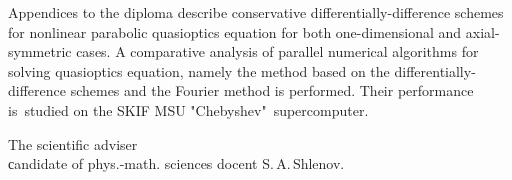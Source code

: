 \documentclass[12pt,a4paper]{article}
\begin{document}
Appendices to the diploma describe conservative differentially-difference schemes for nonlinear parabolic quasioptics equation
for both one-dimensional and axial-symmetric cases. A comparative analysis of parallel numerical algorithms for solving quasioptics equation,
namely the method based on the differentially-difference schemes and the Fourier method is performed.
Their performance is~studied on the SKIF MSU "Chebyshev"\ supercomputer.

\vspace{4ex}

The scientific adviser \\
сandidate of phys.-math. sciences \hfill docent S.\,A.\,Shlenov.
\end{document}
